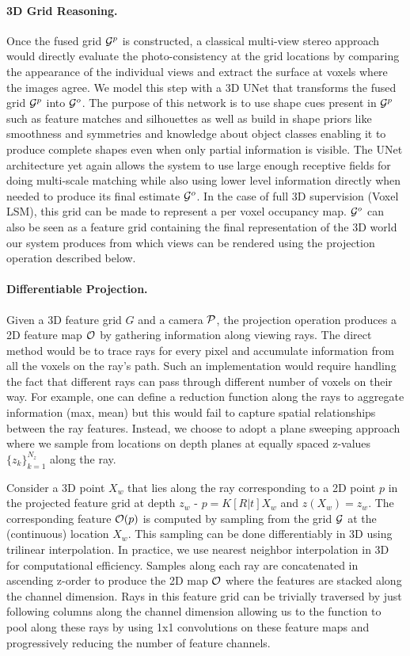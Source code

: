 \documentclass[../thesis.tex]{subfiles}
\begin{document}
\paragraph{3D Grid Reasoning.}
Once the fused grid $\mathcal{G}^p$ is constructed, a classical multi-view stereo approach would directly evaluate the photo-consistency at the grid locations by comparing the appearance of the individual views and extract the surface at voxels where the images agree. We model this step with a 3D UNet that transforms the fused grid $\mathcal{G}^p$ into $\mathcal{G}^o$. The purpose of this network is to use shape cues present in $\mathcal{G}^p$ such as feature matches and silhouettes as well as build in shape priors like smoothness and symmetries and knowledge about object classes enabling it to produce complete shapes even when only partial information is visible. The UNet architecture yet again allows the system to use large enough receptive fields for doing multi-scale matching while also using lower level information directly when needed to produce its final estimate $\mathcal{G}^o$. In the case of full 3D supervision (Voxel LSM), this grid can be made to represent a per voxel occupancy map. $\mathcal{G}^o$ can also be seen as a feature grid containing the final representation of the 3D world our system produces from which views can be rendered using the projection operation described below.


\paragraph{Differentiable Projection.}
Given a 3D feature grid $G$ and a camera $\mathcal{P}$, the projection operation produces a 2D feature map $\mathcal{O}$ by gathering information along viewing rays. The direct method would be to trace rays for every pixel and accumulate information from all the voxels on the ray's path. Such an implementation would require handling the fact that different rays can pass through different number of voxels on their way. For example, one can define a reduction function along the rays to aggregate information (\eg max, mean) but this would fail to capture spatial relationships between the ray features. Instead, we choose to adopt a plane sweeping approach where we sample from locations on depth planes at equally spaced z-values $\{z_k\}_{k=1}^{N_z}$ along the ray.

Consider a 3D point $X_w$ that lies along the ray corresponding to a 2D point $p$ in the projected feature grid at depth $z_w$ - \ie $p=K[R|t]X_{w}$ and $z(X_w)=z_w$. The corresponding feature $\mathcal{O}(p)$ is computed by sampling from the grid $\mathcal{G}$ at the (continuous) location $X_w$. This sampling can be done differentiably in 3D using trilinear interpolation. In practice, we use nearest neighbor interpolation in 3D for computational efficiency. Samples along each ray are concatenated in ascending z-order to produce the 2D map $\mathcal{O}$ where the features are stacked along the channel dimension. Rays in this feature grid can be trivially traversed by just following columns along the channel dimension allowing us to  the function to pool along these rays by using 1x1 convolutions on these feature maps and progressively reducing the number of feature channels.
\end{document}
